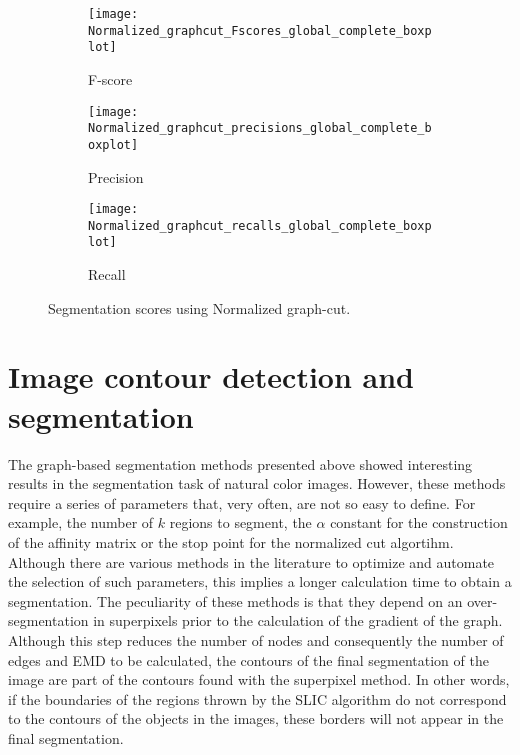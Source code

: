 \begin{figure}[!ht]
    \centering
    \begin{subfigure}[b]{0.3\textwidth}
        \texttt{[image: Normalized\_graphcut\_Fscores\_global\_complete\_boxplot]}
        \caption{F-score}
    \end{subfigure}     
    \begin{subfigure}[b]{0.3\textwidth}
    	\centering
    	\texttt{[image: Normalized\_graphcut\_precisions\_global\_complete\_boxplot]}
        \caption{Precision}
    \end{subfigure}     
    \begin{subfigure}[b]{0.3\textwidth}
    	\centering
        \texttt{[image: Normalized\_graphcut\_recalls\_global\_complete\_boxplot]}
        \caption{Recall}
    \end{subfigure} 
        	    
    \caption{Segmentation scores using Normalized graph-cut.}\label{fig:boxplot_normalized_graphcut}    
\end{figure}

\section{Image contour detection and segmentation}

The graph-based segmentation methods presented above showed interesting results in the segmentation task of natural color images. However, these methods require a series of parameters that, very often, are not so easy to define. For example, the number of $k$ regions to segment, the $\alpha$ constant for the construction of the affinity matrix or the stop point for the normalized cut algortihm. Although there are various methods in the literature to optimize and automate the selection of such parameters, this implies a longer calculation time to obtain a segmentation. The peculiarity of these methods is that they depend on an over-segmentation in superpixels prior to the calculation of the gradient of the graph. Although this step reduces the number of nodes and consequently the number of edges and EMD to be calculated, the contours of the final segmentation of the image are part of the contours found with the superpixel method. In other words, if the boundaries of the regions thrown by the SLIC algorithm do not correspond to the contours of the objects in the images, these borders will not appear in the final segmentation.

